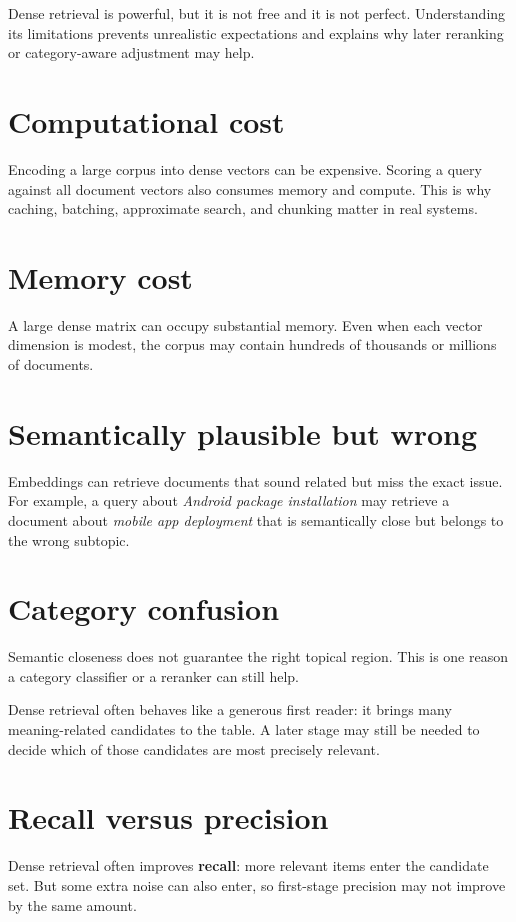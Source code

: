 \documentclass[11pt,oneside]{report}
\newcommand{\term}[1]{\textbf{#1}}
\begin{document}
\begin{purposebox}
Dense retrieval is powerful, but it is not free and it is not perfect. Understanding its limitations prevents unrealistic expectations and explains why later reranking or category-aware adjustment may help.
\end{purposebox}

\section*{Computational cost}
Encoding a large corpus into dense vectors can be expensive. Scoring a query against all document vectors also consumes memory and compute. This is why caching, batching, approximate search, and chunking matter in real systems.

\section*{Memory cost}
A large dense matrix can occupy substantial memory. Even when each vector dimension is modest, the corpus may contain hundreds of thousands or millions of documents.

\section*{Semantically plausible but wrong}
Embeddings can retrieve documents that sound related but miss the exact issue. For example, a query about \emph{Android package installation} may retrieve a document about \emph{mobile app deployment} that is semantically close but belongs to the wrong subtopic.

\section*{Category confusion}
Semantic closeness does not guarantee the right topical region. This is one reason a category classifier or a reranker can still help.

\begin{intuitionbox}
Dense retrieval often behaves like a generous first reader: it brings many meaning-related candidates to the table. A later stage may still be needed to decide which of those candidates are most precisely relevant.
\end{intuitionbox}

\section*{Recall versus precision}
Dense retrieval often improves \term{recall}: more relevant items enter the candidate set. But some extra noise can also enter, so first-stage precision may not improve by the same amount.
\end{document}
